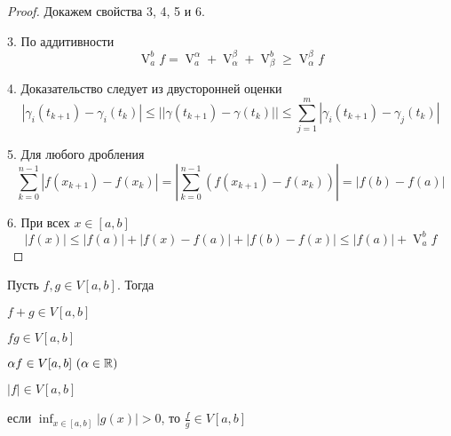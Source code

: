 \begin{proof}
	Докажем свойства 3, 4, 5 и 6.
	
	3. По аддитивности 
	\[\mathop{V}_a^b f = \mathop{V}_a^\alpha + \mathop{V}_\alpha^\beta + \mathop{V}_\beta^b \geqslant \mathop{V}_\alpha^\beta f\] 

	4. Доказательство следует из двусторонней оценки
	\[|\gamma_i(t_{k + 1}) - \gamma_i (t_k)| \leqslant ||\gamma(t_{k + 1}) - \gamma(t_k)|| \leqslant \sum_{j = 1}^m |\gamma_i (t_{k + 1}) - \gamma_j (t_k)|\]

	5. Для любого дробления
	\[\sum_{k = 0}^{n - 1} |f(x_{k + 1}) - f(x_k)| = \left|\sum_{k = 0}^{n - 1} \left(f(x_{k + 1}) - f(x_k)\right)\right| = |f(b) - f(a)|\]

	6. При всех $x \in [a, b]$
	\[|f(x)| \leqslant |f(a)| + |f(x) - f(a)| + |f(b) - f(x)| \leqslant |f(a)| + \mathop{V}_a^b f\]
\end{proof}

\begin{Thm} \label{thm:32}
	Пусть $f, g \in V[a, b]$. Тогда
	\begin{MyList}
		\item $f + g \in V[a, b]$ 
		\item $fg \in V[a, b]$ 
		\item $\alpha f \in V[a, b] \ (\alpha \in \mathbb{R})$
		\item $|f| \in V[a, b]$ 
		\item если $\displaystyle \inf_{x \in [a, b]} |g(x)| > 0$, то $\frac{f}{g} \in V[a, b]$  
	\end{MyList}
\end{Thm}

